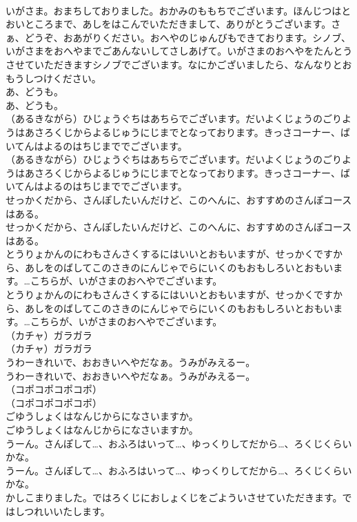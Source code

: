 \documentclass[8pt]{extreport}
\begin{document}
\begin{CJK}{UTF8}{min}
\\	いがさま。おまちしておりました。おかみのももちでございます。ほんじつはとおいところまで、あしをはこんでいただきまして、ありがとうございます。さぁ、どうぞ、おあがりください。おへやのじゅんびもできております。シノブ、いがさまをおへやまでごあんないしてさしあげて。いがさまのおへやをたんとうさせていただきますシノブでございます。なにかございましたら、なんなりとおもうしつけください。
\\	あ、どうも。
\\	あ、どうも。
\\	（あるきながら）ひじょうぐちはあちらでございます。だいよくじょうのごりようはあさろくじからよるじゅうにじまでとなっております。きっさコーナー、ばいてんはよるのはちじまででございます。
\\	（あるきながら）ひじょうぐちはあちらでございます。だいよくじょうのごりようはあさろくじからよるじゅうにじまでとなっております。きっさコーナー、ばいてんはよるのはちじまででございます。
\\	せっかくだから、さんぽしたいんだけど、このへんに、おすすめのさんぽコースはある。
\\	せっかくだから、さんぽしたいんだけど、このへんに、おすすめのさんぽコースはある。
\\	とうりょかんのにわもさんさくするにはいいとおもいますが、せっかくですから、あしをのばしてこのさきのにんじゃでらにいくのもおもしろいとおもいます。…こちらが、いがさまのおへやでございます。
\\	とうりょかんのにわもさんさくするにはいいとおもいますが、せっかくですから、あしをのばしてこのさきのにんじゃでらにいくのもおもしろいとおもいます。…こちらが、いがさまのおへやでございます。
\\	（カチャ）ガラガラ
\\	（カチャ）ガラガラ
\\	うわーきれいで、おおきいへやだなぁ。うみがみえるー。
\\	うわーきれいで、おおきいへやだなぁ。うみがみえるー。
\\	（コポコポコポコポ）
\\	（コポコポコポコポ）
\\	ごゆうしょくはなんじからになさいますか。
\\	ごゆうしょくはなんじからになさいますか。
\\	うーん。さんぽして…、おふろはいって…、ゆっくりしてだから…、ろくじくらいかな。
\\	うーん。さんぽして…、おふろはいって…、ゆっくりしてだから…、ろくじくらいかな。
\\	かしこまりました。ではろくじにおしょくじをごよういさせていただきます。ではしつれいいたします。

\end{CJK}
\end{document}
